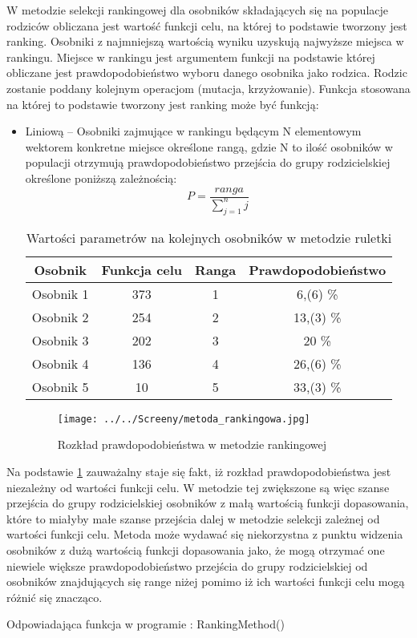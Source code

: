 W metodzie selekcji rankingowej dla osobników składających się na populacje rodziców    obliczana jest wartość funkcji celu, na której to podstawie tworzony jest ranking. Osobniki z najmniejszą wartością wyniku uzyskują najwyższe miejsca w rankingu. Miejsce w rankingu jest argumentem funkcji na podstawie której obliczane jest prawdopodobieństwo wyboru danego osobnika jako rodzica. Rodzic zostanie poddany kolejnym operacjom (mutacja, krzyżowanie). Funkcja stosowana na której to podstawie tworzony jest ranking może być funkcją:
\vspace{0,4cm}
\begin{itemize}
\item
Liniową – Osobniki zajmujące w rankingu będącym N elementowym wektorem konkretne miejsce określone rangą, gdzie N to ilość osobników w populacji otrzymują prawdopodobieństwo przejścia do grupy rodzicielskiej określone poniższą zależnością:
$$
P = \frac{ranga}{\sum_{j=1}^{n}j}
$$

\begin{table}
\begin{center}
\begin{tabular}{|c|c|c|c|}
\hline
\textbf{Osobnik}  & \textbf{Funkcja celu} & \textbf{Ranga} & \textbf{Prawdopodobieństwo}\\
\hline
Osobnik 1 & 373 & 1 & 6,(6) \% \\
\hline
Osobnik 2 &254 & 2  & 13,(3)  \% \\
\hline
Osobnik 3 & 202 & 3 & 20  \% \\
\hline
Osobnik 4 & 136 & 4 & 26,(6)  \% \\
\hline
Osobnik 5 & 10 & 5 & 33,(3)  \% \\
\hline
\end{tabular}
\caption{Wartości parametrów na kolejnych osobników w metodzie ruletki}
\end{center}
\end{table}

\vspace{0,4cm}

\begin{figure}[h]
		\texttt{[image: ../../Screeny/metoda\_rankingowa.jpg]}
		\caption{Rozkład prawdopodobieństwa w metodzie rankingowej}
		\label{ranking}			
\end{figure}

\end{itemize} 
\par
Na podstawie \ref{ranking} zauważalny staje się fakt, iż rozkład prawdopodobieństwa jest niezależny od wartości funkcji celu. W metodzie tej zwiększone są więc szanse przejścia do grupy rodzicielskiej osobników z małą wartością funkcji dopasowania, które to miałyby małe szanse przejścia dalej w metodzie selekcji zależnej od wartości funkcji celu. Metoda może wydawać się niekorzystna z punktu widzenia osobników z dużą wartością funkcji dopasowania jako, że mogą otrzymać one niewiele większe prawdopodobieństwo przejścia do grupy rodzicielskiej od osobników znajdujących się range niżej pomimo iż ich wartości funkcji celu mogą różnić się znacząco.
\par
\vspace{0,4cm}
Odpowiadająca funkcja w programie : RankingMethod()

